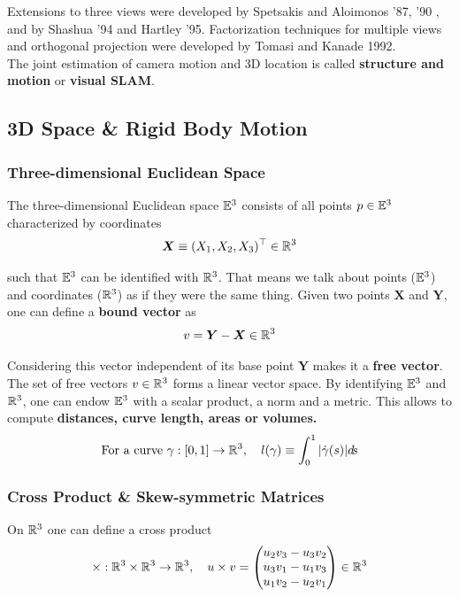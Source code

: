 Extensions to three views were developed by Spetsakis and Aloimonos '87, '90
, and by Shashua '94 and Hartley '95.
Factorization techniques for multiple views and orthogonal projection were
developed by Tomasi and Kanade 1992.\\

The joint estimation of camera motion and 3D location is called
\textbf{structure and motion} or \textbf{visual SLAM}.


\subsection{3D Space \& Rigid Body Motion}
\label{sub:3d_space_rigid_body_motion}


\subsubsection{Three-dimensional Euclidean Space}
\label{ssub:three_dimensional_euclidean_space}

The three-dimensional Euclidean space $\mathbb{E}^3$ consists of all points
$p \in \mathbb{E}^3$ characterized by coordinates
	\[\bm{X} \equiv (X_1, X_2, X_3)^{\top} \in \mathbb{R}^3\]

such that $\mathbb{E}^3$ can be identified with $\mathbb{R}^3$.
That means we talk about points ($\mathbb{E}^3$) and coordinates ($\mathbb{R}^3$)
as if they were the same thing. Given two points $\bm{X}$ and $\bm{Y}$,
one can define a \textbf{bound vector} as
	\[v = \bm{Y} - \bm{X} \in \mathbb{R}^3\]

Considering this vector independent of its base point $\bm{Y}$ makes
it a \textbf{free vector}. The set of free vectors $v \in \mathbb{R}^3$
forms a linear vector space. By identifying $\mathbb{E}^3$ and $\mathbb{R}^3$,
one can endow $\mathbb{E}^3$ with a scalar product, a norm and a metric.
This allows to compute \textbf{distances, curve length, areas or volumes.}
\[\text{For a curve } \gamma : [0,1] \rightarrow \mathbb{R}^3,\quad
	l(\gamma) \equiv \int_{0}^1 | \dot{\gamma}(s) | d\!s\]


\subsubsection{Cross Product \& Skew-symmetric Matrices}
\label{ssub:cross_product_and_skew_symmetric_matrices}

On $\mathbb{R}^3$ one can define a cross product
\[\times : \mathbb{R}^3 \times \mathbb{R}^3 \rightarrow \mathbb{R}^3,\quad u \times v =
	\begin{pmatrix}
		u_2v_3 - u_3v_2 \\
		u_3v_1 - u_1v_3 \\
		u_1v_2 - u_2v_1
	\end{pmatrix} \in \mathbb{R}^3\]

